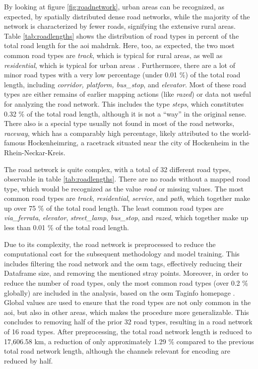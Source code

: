 By looking at figure \ref{fig:roadnetwork}, urban areas can be recognized, as expected, by spatially distributed dense road networks, while the majority of the network is characterized by fewer roads, signifying the extensive rural areas. Table \ref{tab:roadlengths} shows the distribution of road types in percent of the total road length for the \gls{aoi} \gls{mahdrnk}. Here, too, as expected, the two most common road types are \emph{track}, which is typical for rural areas, as well as \emph{residential}, which is typical for urban areas \autocite{Atwal.Anderson.ea2022,Forget.Linard.ea2018}. Furthermore, there are a lot of minor road types with a very low percentage (under 0.01 \%) of the total road length, including \emph{corridor, platform, bus\_stop}, and \emph{elevator}. Most of these road types are either remains of earlier mapping actions (like \emph{razed}) or data not useful for analyzing the road network. This includes the type \emph{steps}, which constitutes 0.32 \% of the total road length, although it is not a \enquote{way} in the original sense. There also is a special type usually not found in most of the road networks, \emph{raceway}, which has a comparably high percentage, likely attributed to the world-famous Hockenheimring, a racetrack situated near the city of Hockenheim in the Rhein-Neckar-Kreis.

The road network is quite complex, with a total of 32 different road types, observable in table \ref{tab:roadlengths}. There are no roads without a mapped road type, which would be recognized as the value \emph{road} or missing values. The most common road types are \emph{track}, \emph{residential}, \emph{service}, and \emph{path}, which together make up over 75 \% of the total road length. The least common road types are \emph{via\_ferrata}, \emph{elevator}, \emph{street\_lamp}, \emph{bus\_stop}, and \emph{razed}, which together make up less than 0.01 \% of the total road length.

Due to its complexity, the road network is preprocessed to reduce the computational cost for the subsequent methodology and model training. This includes filtering the road network and the \gls{osm} tags, effectively reducing their Dataframe size, and removing the mentioned stray points. Moreover, in order to reduce the number of road types, only the most common road types (over 0.2 \% globally) are included in the analysis, based on the \gls{osm} Taginfo homepage \autocite{OSMTaginfo2024}. Global values are used to ensure that the road types are not only common in the \gls{aoi}, but also in other areas, which makes the procedure more generalizable. This concludes to removing half of the prior 32 road types, resulting in a road network of 16 road types. After preprocessing, the total road network length is reduced to 17,606.58 km, a reduction of only approximately 1.29 \% compared to the previous total road network length, although the channels relevant for encoding are reduced by half.

